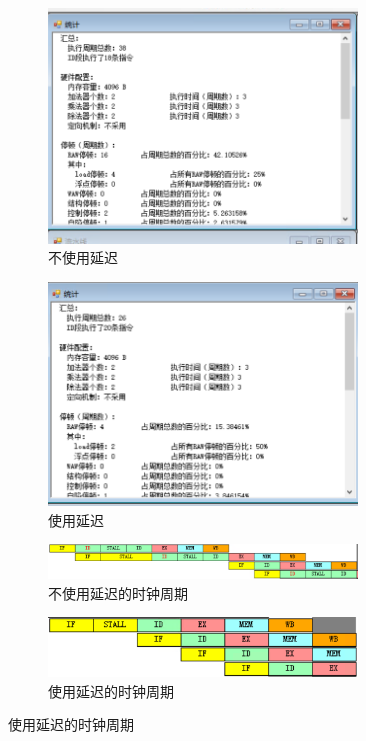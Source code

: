 \documentclass[a4paper,twoside]{article}
\begin{document}
\begin{spacing}{1.2}
\begin{figure}[htb]
	\centering
	\begin{subfigure}[b]{0.4\textwidth}
		\centering
		\includegraphics[width=0.9\textwidth]{images/delaybefore.png}
		\caption{不使用延迟}
		\label{fig:nodelay}
	\end{subfigure}
	\begin{subfigure}[b]{0.4\textwidth}
		\centering
		\includegraphics[width=0.9\textwidth]{images/delayafter.png}
		\caption{使用延迟}
		\label{fig:delay}
	\end{subfigure}
	\begin{subfigure}[b]{0.4\textwidth}
		\centering
		\includegraphics[width=0.9\textwidth]{images/tdelaybefore.png}
		\caption{不使用延迟的时钟周期}
		\label{fig:nodelayinst}
	\end{subfigure}
	\begin{subfigure}[b]{0.4\textwidth}
		\centering
		\includegraphics[width=0.9\textwidth]{images/tdelayafter.png}
		\caption{使用延迟的时钟周期}
		\label{fig:delayinst}
	\end{subfigure}
\end{figure}


\end{spacing}
\end{document}
